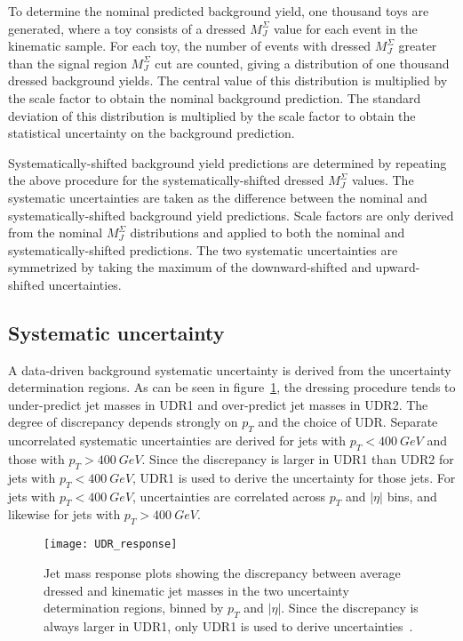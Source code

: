 To determine the nominal predicted background yield, one thousand toys are generated,
where a toy consists of a dressed $M_{J}^{\Sigma}$ value for each event in the kinematic sample.
For each toy, the number of events with dressed $M_{J}^{\Sigma}$ greater than the signal region $M_{J}^{\Sigma}$ cut are counted,
giving a distribution of one thousand dressed background yields.
The central value of this distribution is multiplied by the scale factor to obtain the nominal background prediction.
The standard deviation of this distribution is multiplied by the scale factor to obtain the statistical uncertainty on the background prediction.

Systematically-shifted background yield predictions are determined by repeating the above procedure for the systematically-shifted dressed $M_{J}^{\Sigma}$ values.
The systematic uncertainties are taken as the difference between the nominal and systematically-shifted background yield predictions.
Scale factors are only derived from the nominal $M_{J}^{\Sigma}$ distributions and applied to both the nominal and systematically-shifted predictions.
The two systematic uncertainties are symmetrized by taking the maximum of the \linebreak downward-shifted and upward-shifted uncertainties.

\subsection{Systematic uncertainty} \label{subsec:bkg_uncert}
A data-driven background systematic uncertainty is derived from the uncertainty determination regions.
As can be seen in figure~\ref{fig:udr_response}, the dressing procedure tends to under-predict jet masses in UDR1 and over-predict jet masses in UDR2.
The degree of discrepancy depends strongly on $p_T$ and the choice of UDR.
Separate uncorrelated systematic uncertainties are derived for jets with $p_T<400~GeV$ and those with $p_T>400~GeV$.
Since the discrepancy is larger in UDR1 than UDR2 for jets with $p_T<400~GeV$, UDR1 is used to derive the uncertainty for those jets.
For jets with $p_T<400~GeV$, uncertainties are correlated across $p_T$ and $|\eta|$ bins, and likewise for jets with $p_T>400~GeV$.

\begin{figure}[!ht]
    \centering
    \texttt{[image: UDR\_response]}
    \caption{Jet mass response plots showing the discrepancy between average dressed and kinematic jet masses in the two uncertainty
    determination regions, binned by $p_T$ and $|\eta|$.
    Since the discrepancy is always larger in UDR1, only UDR1 is used to derive uncertainties~\cite{paper-plb}.}
    \label{fig:udr_response}
\end{figure}

